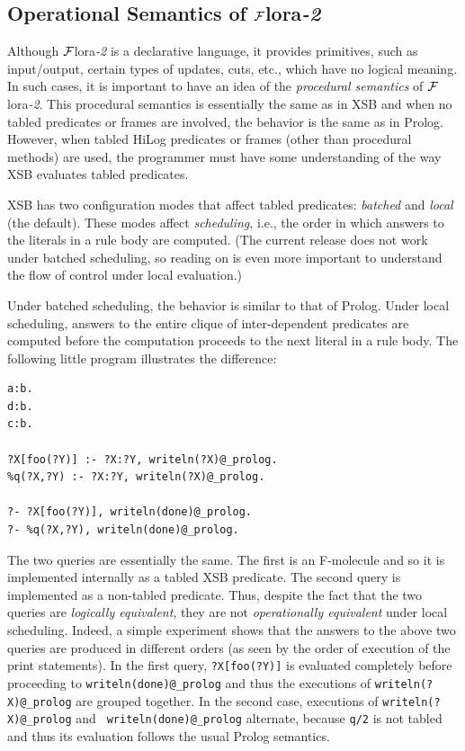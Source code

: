 \documentclass[11pt]{article}
\newcommand{\FLORA}{{\mbox{\sc ${\cal F}${lora}\rm\emph{-2}}}\xspace}
\begin{document}
\subsection{Operational Semantics of \FLORA}\label{sec-flora-procedural}

Although \FLORA is a declarative language, it provides primitives, such as
input/output, certain types of updates, cuts, etc., which have no logical
meaning. In such cases, it is important to have an idea of the
\emph{procedural semantics} of \FLORA. This procedural semantics is
essentially the same as in XSB and when no tabled predicates or frames
are involved, the behavior is the same as in Prolog. However, when tabled
HiLog predicates or frames (other than procedural methods) are used,
the programmer must have some understanding of the way XSB evaluates tabled
predicates.

XSB has two configuration modes that affect tabled predicates:
\emph{batched} and \emph{local} (the default). These modes affect
\emph{scheduling}, i.e., the order in which answers to the literals
in a rule body are computed.
(The current release does not work under batched scheduling, so reading on
is even more important to understand the flow of control under local
evaluation.)

Under batched scheduling, the behavior is similar to that of Prolog.
Under local scheduling, answers to the entire clique of inter-dependent
predicates are computed before the computation proceeds to the next literal
in a rule body. The following little program illustrates the difference:
\begin{verbatim}
a:b.
d:b.
c:b.

?X[foo(?Y)] :- ?X:?Y, writeln(?X)@_prolog.
%q(?X,?Y) :- ?X:?Y, writeln(?X)@_prolog.

?- ?X[foo(?Y)], writeln(done)@_prolog.
?- %q(?X,?Y), writeln(done)@_prolog.
\end{verbatim}
The two queries are essentially the same. The first is an F-molecule
and so it is implemented internally as a tabled XSB predicate. The
second query is implemented as a non-tabled predicate.  Thus, despite
the fact that the two queries are \emph{logically equivalent}, they are
not \emph{operationally equivalent} under local scheduling.  Indeed, a
simple experiment shows that the answers to the above two queries are
produced in different orders (as seen by the order of execution of the
print statements).  In the first query, \verb|?X[foo(?Y)]| is evaluated
completely before proceeding to {\tt writeln(done)@\_prolog} and thus
the executions of {\tt writeln(?X)@\_prolog} are grouped together. In the
second case, executions of {\tt writeln(?X)@\_prolog} and {\tt
writeln(done)@\_prolog} alternate, because {\tt \verb|q|/2} is not tabled
and thus its evaluation follows the usual Prolog semantics.
\end{document}
